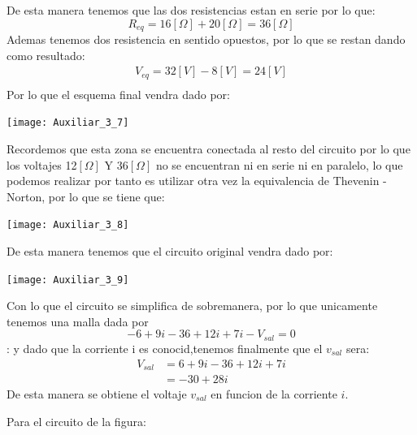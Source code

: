 \documentclass[
  11pt,
  letterpaper,
   addpoints,
   answers
  ]{exam}
\begin{document}
\begin{questions}
\begin{solution}
\begin{center}
        \end{center}
        De esta manera tenemos que las dos resistencias estan en serie por lo que:
        \begin{equation}
            R_{eq} = 16[\Omega] + 20[\Omega] = 36[\Omega]
        \end{equation} 
        Ademas tenemos dos resistencia en sentido opuestos, por lo que se restan dando como resultado:
        \begin{align}
            V_{eq} = 32[V] - 8[V] = 24[V]\\
        \end{align}
        Por lo que el esquema final vendra dado por:
        \begin{center}
            \texttt{[image: Auxiliar\_3\_7]}
        \end{center}
        Recordemos que esta zona se encuentra conectada al resto del circuito por lo que los voltajes 12$[\Omega]$ Y 36$[\Omega]$ no se encuentran ni en serie ni en paralelo, lo que podemos realizar por tanto es utilizar otra vez la equivalencia de Thevenin - Norton, por lo que se tiene que:
        \begin{center}
            \texttt{[image: Auxiliar\_3\_8]}
        \end{center}
        De esta manera tenemos que el circuito original vendra dado por:
        \begin{center}
            \texttt{[image: Auxiliar\_3\_9]}
        \end{center}
        Con lo que el circuito se simplifica de sobremanera, por lo que unicamente tenemos una malla dada por
        \begin{equation}
        -6 +9i - 36 + 12i + 7i - V_{sal}=0 
    \end{equation}:
    y dado que la corriente i es conocid,tenemos finalmente que el $v_{sal}$ sera:
        \begin{align}
            V_{sal} &= 6 + 9i - 36 + 12i + 7i \\
            &= -30 + 28i
        \end{align}
        De esta manera se obtiene el voltaje $v_{sal}$ en funcion de la corriente $i$.
    \end{solution}
    \question  Para el circuito de la figura:


\end{questions}
\end{document}
